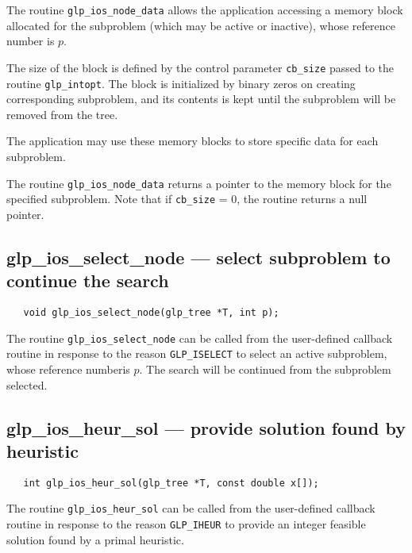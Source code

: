 \description

The routine \verb|glp_ios_node_data| allows the application accessing
a memory block allocated for the subproblem (which may be active or
inactive), whose reference number is $p$.

The size of the block is defined by the control parameter
\verb|cb_size| passed to the routine \verb|glp_intopt|. The block is
initialized by binary zeros on creating corresponding subproblem, and
its contents is kept until the subproblem will be removed from the
tree.

The application may use these memory blocks to store specific data for
each subproblem.

\returns

The routine \verb|glp_ios_node_data| returns a pointer to the memory
block for the specified subproblem. Note that if \verb|cb_size| = 0,
the routine returns a null pointer.

\subsection{glp\_ios\_select\_node --- select subproblem to continue
the search}

\synopsis

\begin{verbatim}
   void glp_ios_select_node(glp_tree *T, int p);
\end{verbatim}

\description

The routine \verb|glp_ios_select_node| can be called from the
user-defined callback routine in response to the reason
\verb|GLP_ISELECT| to select an active subproblem, whose reference
number\linebreak is $p$. The search will be continued from the
subproblem selected.

\newpage

\subsection{glp\_ios\_heur\_sol --- provide solution found by
heuristic}

\synopsis

\begin{verbatim}
   int glp_ios_heur_sol(glp_tree *T, const double x[]);
\end{verbatim}

\description

The routine \verb|glp_ios_heur_sol| can be called from the user-defined
callback routine in response to the reason \verb|GLP_IHEUR| to provide
an integer feasible solution found by a primal heuristic.

